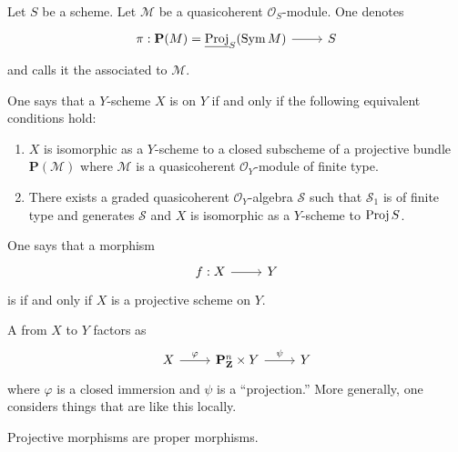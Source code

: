 \documentclass [11 pt, oneside] {article}
\begin{document}
\begin{definition}\label{thatinfamousdef}\text{}
Let $S$ be a scheme. Let $\mathscr{M}$ be a quasicoherent $\mathscr{O}_S$-module. One denotes 
\[
\begin{tikzcd}
\pi : \mathbf{P}(\mathscr{M}) = \underline{\Proj}_S(\Sym \mathscr{M})\ar[r]& S
\end{tikzcd}
\] 
and calls it the  associated to $\mathscr{M}$.
\end{definition}


\begin{definition}\label{ega552}\text{}
One says that a $Y$-scheme $X$ is  on $Y$ if and only if the following equivalent conditions hold:
\begin{enumerate}
	\item $X$ is isomorphic as a $Y$-scheme to a closed subscheme of a projective bundle $\mathbf{P}(\mathscr{M})$ where $\mathscr{M}$ is a quasicoherent $\mathscr{O}_Y$-module of finite type.
	\item There exists a graded quasicoherent $\mathscr{O}_Y$-algebra $\mathscr{S}$ such that $\mathscr{S}_1$ is of finite type and generates $\mathscr{S}$ and $X$ is isomorphic as a $Y$-scheme to $\operatorname{Proj} \relax{S}$.
\end{enumerate}

One says that a morphism 
\[
\begin{tikzcd}
f:X\ar[r]&Y
\end{tikzcd}
\] 
is  if and only if $X$ is a projective scheme on $Y$.
\end{definition}

\begin{definition}
	A  from $X$ to $Y$ factors as 
	\[
	\begin{tikzcd}
		X\ar[r,"\varphi"] & \mathbf{P}^n_{\mathbf{Z}} \times Y \ar[r, "\psi"] & Y
	\end{tikzcd}
	\]
	where $\varphi$ is a closed immersion and $\psi$ is a ``projection.'' More generally, one considers things that are like this locally.
\end{definition}

\begin{proposition}[ ]\label{}\text{}
Projective morphisms are proper morphisms.
\end{proposition}
\end{document}
